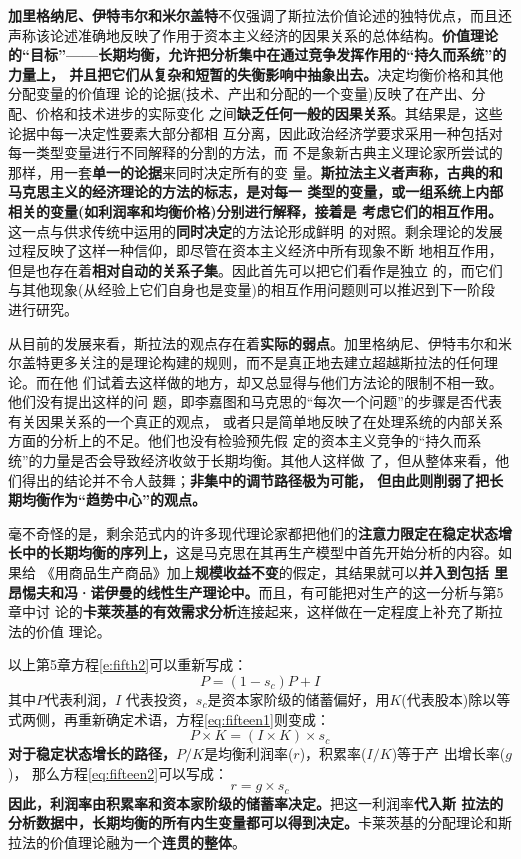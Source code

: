 \textbf{加里格纳尼、伊特韦尔和米尔盖特}不仅强调了斯拉法价值论述的独特优点，而且还
声称该论述准确地反映了作用于资本主义经济的因果关系的总体结构。\textbf{价值理论
  的“目标”——长期均衡，允许把分析集中在通过竞争发挥作用的“持久而系统”的力量上，
  并且把它们从复杂和短暂的失衡影响中抽象出去。}决定均衡价格和其他分配变量的价值理
论的论据(技术、产出和分配的一个变量)反映了在产出、分配、价格和技术进步的实际变化
之间\textbf{缺乏任何一般的因果关系}。其结果是，这些论据中每一决定性要素大部分都相
互分离，因此政治经济学要求采用一种包括对每一类型变量进行不同解释的分割的方法，而
不是象新古典主义理论家所尝试的那样，用一套\textbf{单一的论据}来同时决定所有的变
量。\textbf{斯拉法主义者声称，古典的和马克思主义的经济理论的方法的标志，是对每一
  类型的变量，或一组系统上内部相关的变量(如利润率和均衡价格)分别进行解释，接着是
  考虑它们的相互作用。}这一点与供求传统中运用的\textbf{同时决定}的方法论形成鲜明
的对照。剩余理论的发展过程反映了这样一种信仰，即尽管在资本主义经济中所有现象不断
地相互作用，但是也存在着\textbf{相对自动的关系子集}。因此首先可以把它们看作是独立
的，而它们与其他现象(从经验上它们自身也是变量)的相互作用问题则可以推迟到下一阶段
进行研究。

从目前的发展来看，斯拉法的观点存在着\textbf{实际的弱点}。加里格纳尼、伊特韦尔和米
尔盖特更多关注的是理论构建的规则，而不是真正地去建立超越斯拉法的任何理论。而在他
们试着去这样做的地方，却又总显得与他们方法论的限制不相一致。他们没有提出这样的问
题，即李嘉图和马克思的“每次一个问题”的步骤是否代表有关因果关系的一个真正的观点，
或者只是简单地反映了在处理系统的内部关系方面的分析上的不足。他们也没有检验预先假
定的资本主义竞争的“持久而系统”的力量是否会导致经济收敛于长期均衡。其他人这样做
了，但从整体来看，他们得出的结论并不令人鼓舞；\textbf{非集中的调节路径极为可能，
  但由此则削弱了把长期均衡作为“趋势中心”的观点。}

毫不奇怪的是，剩余范式内的许多现代理论家都把他们的\textbf{注意力限定在稳定状态增
  长中的长期均衡的序列上，}这是马克思在其再生产模型中首先开始分析的内容。如果给
《用商品生产商品》加上\textbf{规模收益不变}的假定，其结果就可以\textbf{并入到包括
  里昂惕夫和冯·诺伊曼的线性生产理论中。}而且，有可能把对生产的这一分析与第5章中讨
论的\textbf{卡莱茨基的有效需求分析}连接起来，这样做在一定程度上补充了斯拉法的价值
理论。

以上第5章方程\eqref{e:fifth2}可以重新写成：
\begin{equation}
P=(1-s_c)P+ I  \label{eq:fifteen1}
\end{equation}
其中$P$代表利润，$I$ 代表投资，$s_c$是资本家阶级的储蓄偏好，用$K$(代表股本)除以等
式两侧，再重新确定术语，方程\eqref{eq:fifteen1}则变成：
\begin{equation}
  \label{eq:fifteen2}
P \times K=(I \times K) \times s_c
\end{equation}
\textbf{对于稳定状态增长的路径，}$P / K$是均衡利润率($r$)，积累率($ I / K$)等于产
出增长率($g$)， 那么方程\eqref{eq:fifteen2}可以写成：
\begin{equation}
  \label{eq:fifteen3}
r=g \times s_c
\end{equation}
\textbf{因此，利润率由积累率和资本家阶级的储蓄率决定。}把这一利润率\textbf{代入斯
  拉法的分析数据中，长期均衡的所有内生变量都可以得到决定。}卡莱茨基的分配理论和斯
拉法的价值理论融为一个\textbf{连贯的整体}。

